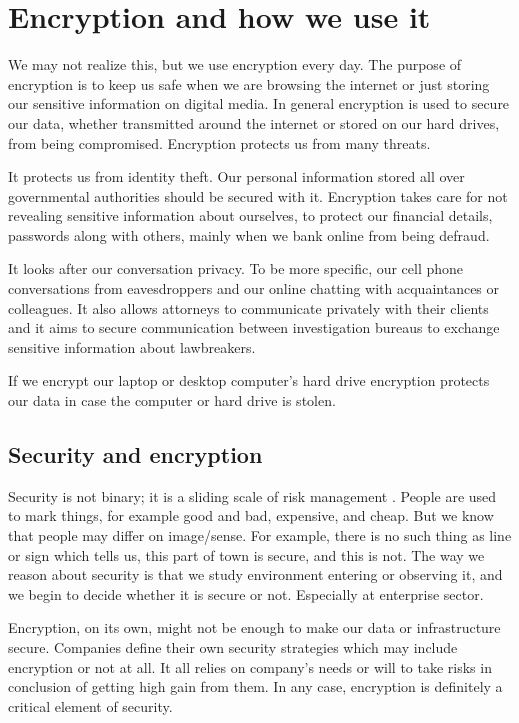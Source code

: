 \chapter{Encryption and how we use it}\label{encryption}

We may not realize this, but we use encryption every day.
The purpose of encryption is to keep us safe when we are browsing the internet or just storing our sensitive information on digital media.
In general encryption is used to secure our data, whether transmitted around the internet or stored on our hard drives, from being compromised.
Encryption protects us from many threats.

It protects us from identity theft.
Our personal information stored all over governmental authorities should be secured with it.
Encryption takes care for not revealing sensitive information about ourselves, to protect our financial details, passwords along with others, mainly when we bank online from being defraud.

It looks after our conversation privacy.
To be more specific, our cell phone conversations from eavesdroppers and our online chatting with acquaintances or colleagues.
It also allows attorneys to communicate privately with their clients and it aims to secure communication between investigation bureaus to exchange sensitive information about lawbreakers.

If we encrypt our laptop or desktop computer's hard drive encryption protects our data in case the computer or hard drive is stolen.

\section{Security and encryption}

Security is not binary; it is a sliding scale of risk management \cite{devconf}.
People are used to mark things, for example good and bad, expensive, and cheap.
But we know that people may differ on image/sense.
For example, there is no such thing as line or sign which tells us, this part of town is secure, and this is not.
The way we reason about security is that we study environment entering or observing it, and we begin to decide whether it is secure or not.
Especially at enterprise sector.

Encryption, on its own, might not be enough to make our data or infrastructure secure.
Companies define their own security strategies which may include encryption or not at all.
It all relies on company's needs or will to take risks in conclusion of getting high gain from them.
In any case, encryption is definitely a critical element of security.

